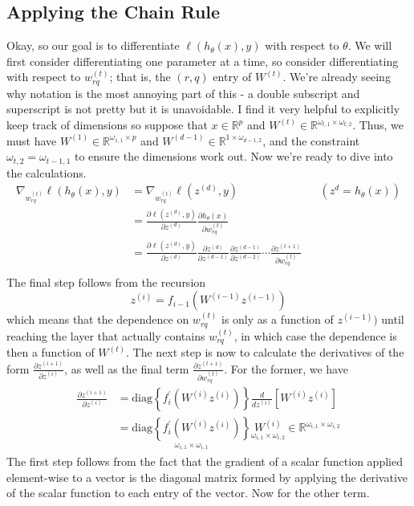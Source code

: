 \documentclass[12pt]{article}
\newcommand{\R}{\mathcal{R}}
\def\R{\mathbb{R}}
\begin{document}
\subsection{Applying the Chain Rule}
Okay, so our goal is to differentiate $\ell(h_\theta(x), y)$ with respect to $\theta$. We will first consider differentiating one parameter at a time, so consider differentiating with 
respect to $w^{(t)}_{rq}$; that is, the $(r, q)$ entry of $W^{(t)}$. We're already seeing why notation is the most annoying part of this - a double subscript and superscript is not pretty 
but it is unavoidable. I find it very helpful to explicitly keep track of dimensions so suppose that $x \in \R^p$ and $W^{(t)} \in \R^{\omega_{t, 1} \times \omega_{t, 2}}$. Thus, we must have 
$W^{(1)} \in \R^{\omega_{1, 1} \times p}$ and $W^{(d - 1)} \in \R^{1 \times \omega_{d-1, 2}}$, and the constraint $\omega_{t, 2} = \omega_{t - 1, 1}$ to ensure the dimensions work out. 
Now we're ready to dive into the calculations. 
\begin{align*}
\nabla_{w_{rq}^{(t)}} \ell(h_\theta(x), y) &= \nabla_{w_{rq}^{(t)}} \ell(z^{(d)}, y) && \left(z^{d} = h_\theta(x) \right) \\ 
							   &= \frac{\partial \ell(z^{(d)}, y)}{\partial z^{(d)}} \frac{\partial h_\theta(x)}{\partial w_{rq}^{(t)}} \\
							   &= \frac{\partial \ell(z^{(d)}, y)}{\partial z^{(d)}} \frac{\partial z^{(d)}}{\partial z^{(d - 1)}} \frac{\partial z^{(d - 1)}}{\partial z^{(d - 2)}} \cdots \frac{\partial z^{(t + 1)}}{\partial w_{rq}^{(t)}}\\
\end{align*}
The final step follows from the recursion
\[z^{(i)} = f_{i - 1}(W^{(i - 1)}z^{(i - 1)})\]
which means that the dependence on $w^{(t)}_{rq}$ is only as a function of $z^{(i - 1)})$ until reaching the layer that actually contains $w^{(t)}_{rq}$, in which case the dependence is 
then a function of $W^{(t)}$. The next step is now to calculate the derivatives of the form $\frac{\partial z^{(i + 1)}}{\partial z^{(i)}}$, as well as the final term $\frac{\partial z^{(t + 1)}}{\partial w_{rq}^{(t)}}$. 
For the former, we have 
\begin{align*}
\frac{\partial z^{(i + 1)}}{\partial z^{(i)}} &= \text{diag}\left\{f_{i}^\prime(W^{(i)}z^{(i)})\right\} \frac{d}{dz^{(i)}} \left[W^{(i)} z^{(i)} \right]\\
							 &= \underset{\omega_{i, 1} \times \omega_{i, 1}}{\text{diag}\left\{f_{i}^\prime(W^{(i)}z^{(i)})\right\}} \underset{\omega_{i, 1} \times \omega_{i, 2}}{W^{(i)}} \in \R^{\omega_{i, 1} \times \omega_{i, 2}}
\end{align*}
The first step follows from the fact that the gradient of a scalar function applied element-wise to a vector is the diagonal matrix formed by applying 
the derivative of the scalar function to each entry of the vector. Now for the other term. 
\end{document}
